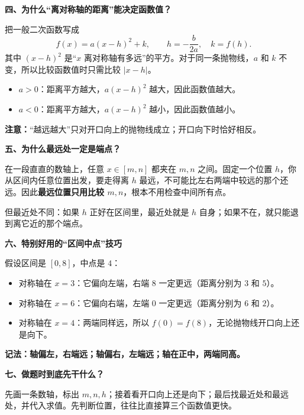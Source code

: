 \clearpage
\begin{explanationbox}
\textbf{\textcolor{CExplanation}{四、为什么“离对称轴的距离”能决定函数值？}}



把一般二次函数写成
\[
 f(x)=a(x-h)^2+k,\qquad h=-\frac{b}{2a},\quad k=f(h).
\]
其中 $(x-h)^2$ 是“$x$ 离对称轴有多远”的平方。对于同一条抛物线，$a$ 和 $k$ 不变，所以比较函数值时只需比较 $|x-h|$。

\begin{itemize}[leftmargin=*,itemsep=0.3em]
\item $a>0$：距离平方越大，$a(x-h)^2$ 越大，因此函数值越大。
\item $a<0$：距离平方越大，$a(x-h)^2$ 越小，因此函数值越小。
\end{itemize}

\textbf{注意：}“越远越大”只对开口向上的抛物线成立；开口向下时恰好相反。

\medskip

\end{explanationbox}
\clearpage
\begin{explanationbox}
\textbf{\textcolor{CExplanation}{五、为什么最远处一定是端点？}}



在一段直直的数轴上，任意 $x\in[m,n]$ 都夹在 $m,n$ 之间。固定一个位置 $h$，你从区间内任意位置出发，要走得离 $h$ 最远，不可能比左右两端中较远的那个还远。因此\textbf{最远位置只用比较 $m,n$}，根本不用检查中间所有点。

但最近处不同：如果 $h$ 正好在区间里，最近处就是 $h$ 自身；如果不在，就只能退到离它近的那个端点。

\medskip

\end{explanationbox}
\clearpage
\begin{explanationbox}
\textbf{\textcolor{CExplanation}{六、特别好用的“区间中点”技巧}}



假设区间是 $[0,8]$，中点是 $4$：
\begin{itemize}[leftmargin=*,itemsep=0.25em]
\item 对称轴在 $x=3$：它偏向左端，右端 $8$ 一定更远（距离分别为 $3$ 和 $5$）。
\item 对称轴在 $x=6$：它偏向右端，左端 $0$ 一定更远（距离分别为 $6$ 和 $2$）。
\item 对称轴在 $x=4$：两端同样远，所以 $f(0)=f(8)$，无论抛物线开口向上还是向下。
\end{itemize}
\textbf{记法：轴偏左，右端远；轴偏右，左端远；轴在正中，两端同高。}

\medskip

\end{explanationbox}
\clearpage
\begin{explanationbox}
\textbf{\textcolor{CExplanation}{七、做题时到底先干什么？}}



先画一条数轴，标出 $m,n,h$；接着看开口向上还是向下；最后找最近处和最远处，并代入求值。先判断位置，往往比直接算三个函数值更快。
\end{explanationbox}
